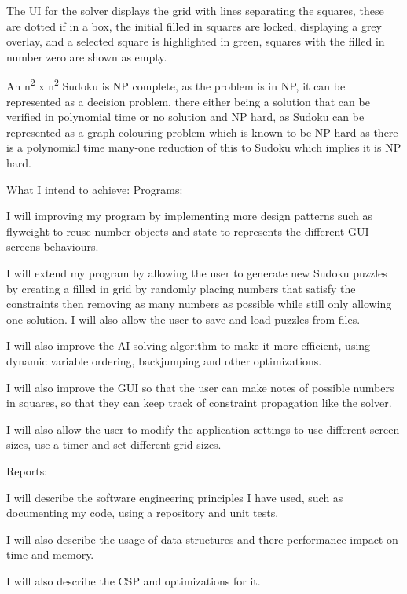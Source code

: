 \documentclass[]{final_report}
\begin{document}
{{		The UI for the solver displays the grid with lines separating the squares, these are dotted if in a box, the initial filled in squares are locked, displaying a grey overlay, and a selected square is highlighted in green, squares with the filled in number zero are shown as empty.
		
		An n\textsuperscript{2} x n\textsuperscript{2} Sudoku is NP complete, as the problem is in NP, it can be represented as a decision problem, there either being a solution that can be verified in polynomial time or no solution and NP hard, as Sudoku can be represented as a graph colouring problem which is known to be NP hard as there is a polynomial time many-one reduction of this to Sudoku which implies it is NP hard.
		
		What I intend to achieve:
		\newline
		Programs:
		
		I will improving my program by implementing more design patterns such as flyweight to reuse number objects and state to represents the different GUI screens behaviours.
		
		I will extend my program by allowing the user to generate new Sudoku puzzles by creating a filled in grid by randomly placing numbers that satisfy the constraints then removing as many numbers as possible while still only allowing one solution. I will also allow the user to save and load puzzles from files.
		
		I will also improve the AI solving algorithm to make it more efficient, using dynamic variable ordering, backjumping and other optimizations.
		
		I will also improve the GUI so that the user can make notes of possible numbers in squares, so that they can keep track of constraint propagation like the solver.
		
		I will also allow the user to modify the application settings to use different screen sizes, use a timer and set different grid sizes.
		
		Reports:
		
		I will describe the software engineering principles I have used, such as documenting my code, using a repository and unit tests.
		
		I will also describe the usage of data structures and there performance impact on time and memory.
		
		I will also describe the CSP and optimizations for it.
		
		\newpage
}}
\end{document}
